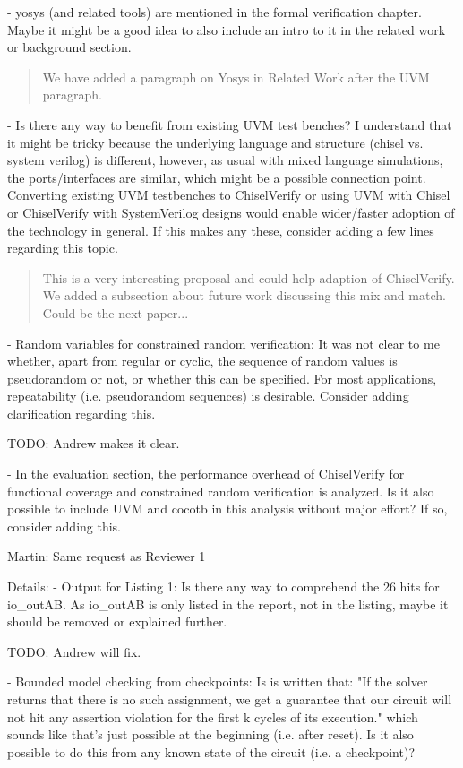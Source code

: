 \documentclass{article}
\newcommand{\todo}[1]{{\color{olive} TODO: #1}}
\newcommand{\martin}[1]{{\color{blue} Martin: #1\\}}
\newcommand{\reply}[1]{{\color{blue} #1}}
\begin{document}
- yosys (and related tools) are mentioned in the formal verification chapter. Maybe it might be a good idea to also include an intro to it in the related work or background section.

\begin{quote}
\reply{We have added a paragraph on Yosys in Related Work after the UVM paragraph.}
\end{quote}

- Is there any way to benefit from existing UVM test benches? I understand that it might be tricky because the underlying language and structure (chisel vs. system verilog) is different, however, as usual with mixed language simulations, the ports/interfaces are similar, which might be a possible connection point. Converting existing UVM testbenches to ChiselVerify or using UVM with Chisel or ChiselVerify with SystemVerilog designs would enable wider/faster adoption of the technology in general. If this makes any these, consider adding a few lines regarding this topic.

\begin{quote}
\reply{This is a very interesting proposal and could help adaption of ChiselVerify. We added a subsection about future work
discussing this mix and match. Could be the next paper...}
\end{quote}


- Random variables for constrained random verification: It was not clear to me whether, apart from regular or cyclic, the sequence of random values is pseudorandom or not, or whether this can be specified. For most applications, repeatability (i.e. pseudorandom sequences) is desirable. Consider adding clarification regarding this.

\todo{Andrew makes it clear.}

- In the evaluation section, the performance overhead of ChiselVerify for functional coverage and constrained random verification is analyzed. Is it also possible to include UVM and cocotb in this analysis without major effort? If so, consider adding this.

\martin{Same request as Reviewer 1}

Details:
- Output for Listing 1: Is there any way to comprehend the 26 hits for io\_outAB. As io\_outAB is only listed in the report, not in the listing, maybe it should be removed or explained further.

\todo{Andrew will fix.}

- Bounded model checking from checkpoints: Is is written that: "If the solver returns that there is no such assignment, we get a guarantee that our circuit will not hit any assertion violation for the first k cycles of its execution." which sounds like that's just possible at the beginning (i.e. after reset). Is it also possible to do this from any known state of the circuit (i.e. a checkpoint)?
\end{document}

